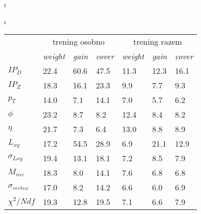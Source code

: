 \clearpage
\i%

\i%



\begin{tabular}{l|lll|lll}
\toprule
{} & \multicolumn{3}{c|}{trening osobno} & \multicolumn{3}{|c}{trening razem} \\
{} & \textit{weight} & \textit{gain} & \textit{cover} & \textit{weight} &   \textit{gain} &  \textit{cover} \\
\midrule
$IP_D$ &     22.4 &         60.6 &          47.5 &   11.3 &       12.3 &        16.1 \\
$IP_Z$ &     18.3 &         16.1 &          23.3 &    9.9 &        7.7 &         9.3 \\
$p_T$               &     14.0 &          7.1 &          14.1 &    7.0 &        5.7 &         6.2 \\
$\phi$              &     23.2 &          8.7 &           8.2 &   12.4 &        8.4 &         8.2 \\
$\eta$              &     21.7 &          7.3 &           6.4 &   13.0 &        8.8 &         8.9 \\
\cline{1-4}
$L_{xy}$              &     17.2 &         54.5 &          28.9 &    6.9 &       21.1 &        12.9 \\
$\sigma_{Lxy}$         &     19.4 &         13.1 &          18.1 &    7.2 &        8.5 &         7.9 \\
$M_{inv}$             &     18.3 &          8.0 &          14.1 &    7.6 &        6.8 &         6.8 \\
$\sigma_{vertex}$       &     17.0 &          8.2 &          14.2 &    6.6 &        6.0 &         6.9 \\
$\chi^2/Ndf$             &     19.3 &         12.8 &          19.5 &    7.1 &        6.6 &         7.9 \\
\bottomrule
\end{tabular}







